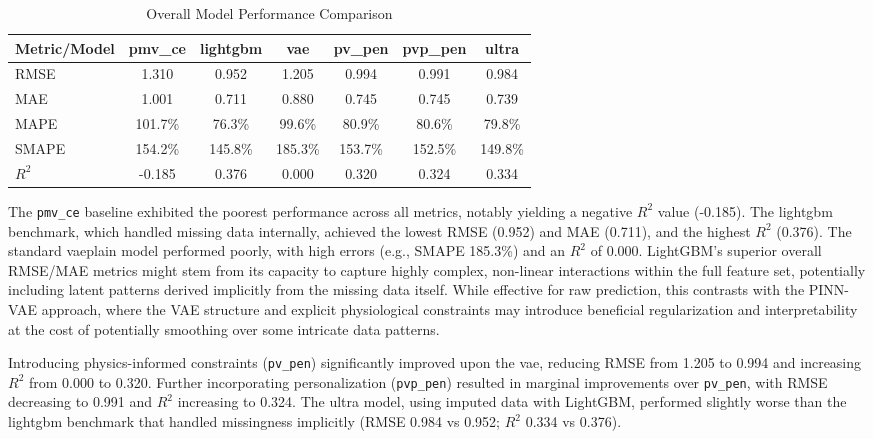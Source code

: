 \begin{table}[h!] %
\centering
\caption{Overall Model Performance Comparison} %
\label{tab:performance_updated} %
\begin{tabular}{lcccccc}
\toprule
Metric/Model & pmv\_ce & lightgbm & vae     & pv\_pen & pvp\_pen & ultra  \\
\midrule
RMSE   & 1.310   & 0.952    & 1.205   & 0.994   & 0.991    & 0.984  \\
MAE    & 1.001   & 0.711    & 0.880   & 0.745   & 0.745    & 0.739  \\
MAPE   & 101.7\% & 76.3\%   & 99.6\%  & 80.9\%  & 80.6\%   & 79.8\% \\
SMAPE  & 154.2\% & 145.8\%  & 185.3\% & 153.7\% & 152.5\%  & 149.8\%\\
$R^2$     & -0.185  & 0.376    & 0.000   & 0.320   & 0.324    & 0.334  \\
\bottomrule
\end{tabular}
\end{table}
The \texttt{pmv\_ce} baseline exhibited the poorest performance across all metrics, notably yielding a negative $R^2$ value (-0.185). The lightgbm benchmark, which handled missing data internally, achieved the lowest RMSE (0.952) and MAE (0.711), and the highest $R^2$ (0.376). The standard \gls{vaeplain} model performed poorly, with high errors (e.g., SMAPE 185.3\%) and an $R^2$ of 0.000. LightGBM's superior overall RMSE/MAE metrics might stem from its capacity to capture highly complex, non-linear interactions within the full feature set, potentially including latent patterns derived implicitly from the missing data itself. While effective for raw prediction, this contrasts with the PINN-VAE approach, where the VAE structure and explicit physiological constraints may introduce beneficial regularization and interpretability at the cost of potentially smoothing over some intricate data patterns.

Introducing physics-informed constraints (\texttt{pv\_pen}) significantly improved upon the vae, reducing RMSE from 1.205 to 0.994 and increasing $R^2$ from 0.000 to 0.320. Further incorporating personalization (\texttt{pvp\_pen}) resulted in marginal improvements over \texttt{pv\_pen}, with RMSE decreasing to 0.991 and $R^2$ increasing to 0.324. The \gls{ultra} model, using imputed data with LightGBM, performed slightly worse than the lightgbm benchmark that handled missingness implicitly (RMSE 0.984 vs 0.952; $R^2$ 0.334 vs 0.376).

